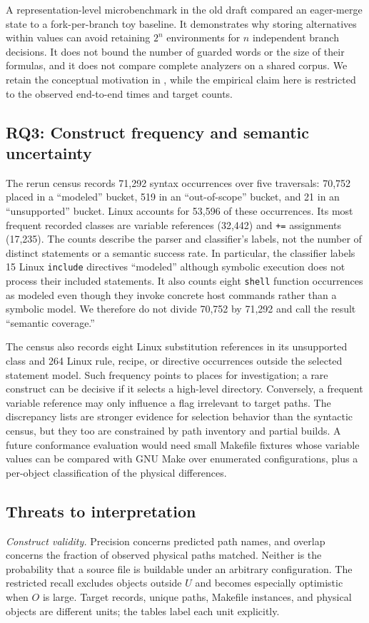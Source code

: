 \documentclass[acmsmall,screen,review]{acmart}
\begin{document}
A representation-level microbenchmark in the old draft compared an eager-merge state to a fork-per-branch toy baseline. It demonstrates why storing alternatives within values can avoid retaining $2^n$ environments for $n$ independent branch decisions. It does not bound the number of guarded words or the size of their formulas, and it does not compare complete analyzers on a shared corpus. We retain the conceptual motivation in , while the empirical claim here is restricted to the observed end-to-end times and target counts.

\subsection{RQ3: Construct frequency and semantic uncertainty}
\label{sec:eval:constructs}
The rerun census records 71,292 syntax occurrences over five traversals: 70,752 placed in a ``modeled'' bucket, 519 in an ``out-of-scope'' bucket, and 21 in an ``unsupported'' bucket. Linux accounts for 53,596 of these occurrences. Its most frequent recorded classes are variable references (32,442) and \texttt{+=} assignments (17,235). The counts describe the parser and classifier's labels, not the number of distinct statements or a semantic success rate. In particular, the classifier labels 15 Linux \texttt{include} directives ``modeled'' although symbolic execution does not process their included statements. It also counts eight \texttt{shell} function occurrences as modeled even though they invoke concrete host commands rather than a symbolic model. We therefore do not divide 70,752 by 71,292 and call the result ``semantic coverage.''

The census also records eight Linux substitution references in its unsupported class and 264 Linux rule, recipe, or directive occurrences outside the selected statement model. Such frequency points to places for investigation; a rare construct can be decisive if it selects a high-level directory. Conversely, a frequent variable reference may only influence a flag irrelevant to target paths. The discrepancy lists are stronger evidence for selection behavior than the syntactic census, but they too are constrained by path inventory and partial builds. A future conformance evaluation would need small Makefile fixtures whose variable values can be compared with GNU Make over enumerated configurations, plus a per-object classification of the physical differences.

\subsection{Threats to interpretation}
\label{sec:eval:threats}
\emph{Construct validity.} Precision concerns predicted path names, and overlap concerns the fraction of observed physical paths matched. Neither is the probability that a source file is buildable under an arbitrary configuration. The restricted recall excludes objects outside $U$ and becomes especially optimistic when $O$ is large. Target records, unique paths, Makefile instances, and physical objects are different units; the tables label each unit explicitly.
\end{document}
